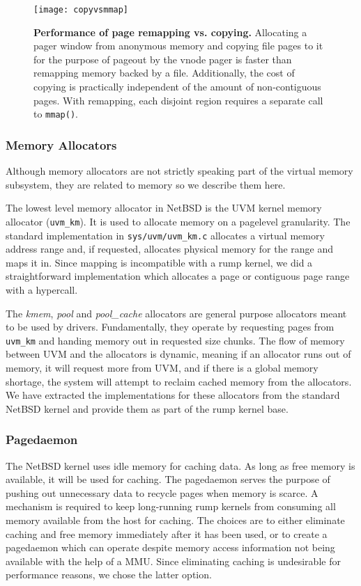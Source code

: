 \begin{figure}[t]
\texttt{[image: copyvsmmap]}
\caption[Performance of page remapping vs. copying]{
\textbf{Performance of page remapping vs. copying.}
Allocating a pager window from anonymous memory and copying file
pages to it for the purpose of pageout by the vnode pager is faster
than remapping memory backed by a file.  Additionally, the cost of
copying is practically independent of the amount of non-contiguous
pages.  With remapping, each disjoint region requires a separate
call to \texttt{mmap()}.}
\label{fig:copyvsmmap}
\end{figure}

\subsubsection{Memory Allocators}
\label{sect:malloc}

Although memory allocators are not strictly speaking part of the
virtual memory subsystem, they are related to memory so we describe
them here.

The lowest level memory allocator in NetBSD is the UVM kernel memory
allocator (\verb+uvm_km+).  It is used to allocate memory on a
pagelevel granularity.  The standard implementation in
\verb+sys/uvm/uvm_km.c+ allocates a virtual memory address range
and, if requested, allocates physical memory for the range and maps
it in.  Since mapping is incompatible with a rump kernel, we did
a straightforward implementation which allocates a page or contiguous
page range with a hypercall.

The \textit{kmem}, \textit{pool} and \textit{pool\_cache} allocators
are general purpose allocators meant to be used by drivers.
Fundamentally, they operate by requesting pages from \verb+uvm_km+
and handing memory out in requested size chunks.  The flow of memory between
UVM and the allocators is dynamic, meaning if an allocator runs
out of memory, it will request more from UVM, and if there is a
global memory shortage, the system will attempt to reclaim cached
memory from the allocators.  We have extracted the implementations
for these allocators from the standard NetBSD kernel and provide
them as part of the rump kernel base.

\subsubsection{Pagedaemon}

The NetBSD kernel uses idle memory for caching data.  As long as
free memory is available, it will be used for caching.  The pagedaemon
serves the purpose of pushing out unnecessary data to recycle pages
when memory is scarce.  A mechanism is required to keep long-running
rump kernels from consuming all memory available from the host for
caching.  The choices are to either eliminate caching and free
memory immediately after it has been used, or to create a pagedaemon
which can operate despite memory access information not being
available with the help of a MMU.  Since eliminating caching is
undesirable for performance reasons, we chose the latter option.

